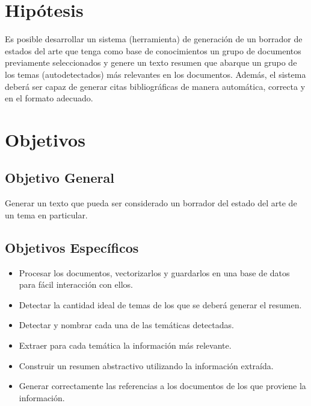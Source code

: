 \section{Hipótesis}
    Es posible desarrollar un sistema (herramienta) de generación de un borrador de estados del arte que tenga como base de conocimientos un grupo de documentos previamente seleccionados y genere un texto resumen que abarque un grupo de los temas (autodetectados) más relevantes en los documentos. Además, el sistema deberá ser capaz de generar citas bibliográficas de manera automática, correcta y en el formato adecuado.

\section{Objetivos}
    \subsection{Objetivo General}

        Generar un texto que pueda ser considerado un borrador del estado del arte de un tema en particular.

    \subsection{Objetivos Específicos}

        \begin{itemize}
            \item Procesar los documentos, vectorizarlos y guardarlos en una base de datos para fácil interacción con ellos.
            \item Detectar la cantidad ideal de temas de los que se deberá generar el resumen.
            \item Detectar y nombrar cada una de las temáticas detectadas.
            \item Extraer para cada temática la información más relevante.
            \item Construir un resumen abstractivo utilizando la información extraída.
            \item Generar correctamente las referencias a los documentos de los que proviene la información.

        \end{itemize}



